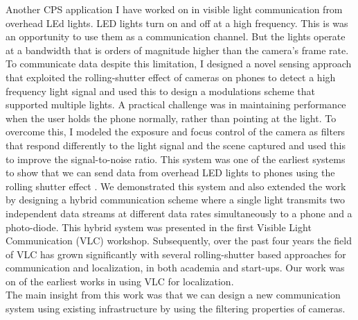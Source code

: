 \documentclass[10pt]{article}
\begin{document}


Another CPS application I have worked on in visible light communication from overhead LEd lights. 
LED lights turn on and off at a high frequency. This is was an opportunity to use them as a communication channel. But the lights operate at a bandwidth that is orders of magnitude higher than the camera's frame rate. 
To communicate data despite this limitation, I designed a novel sensing approach that exploited the rolling-shutter effect of cameras on phones to detect a high frequency light signal and used this to design a modulations scheme that supported multiple lights. 
A practical challenge was in maintaining performance when the user holds the phone normally, rather than pointing at the light. To overcome this, I modeled the exposure and focus control of the camera as filters that respond differently to the light signal and the scene captured and used this to improve the signal-to-noise ratio. This system was one of the earliest systems to show that we can send data from overhead LED lights to phones using the rolling shutter effect \cite{rajagopal2014visual}.  We demonstrated this system \cite{rajagopal2014demonstration} and also extended the work \cite{rajagopal2014hybrid} by designing a hybrid communication scheme where a single light transmits two independent data streams at different data rates simultaneously to a phone and a photo-diode. This hybrid system was presented in the first Visible Light Communication (VLC) workshop. Subsequently, over the past four years the field of VLC has grown significantly with several rolling-shutter based approaches for communication and localization, in both academia and start-ups. Our work was on of the earliest works in using VLC for localization.\\
The main insight from this work was that we can design a new communication system using existing infrastructure by using the filtering properties of cameras.
\end{document}
